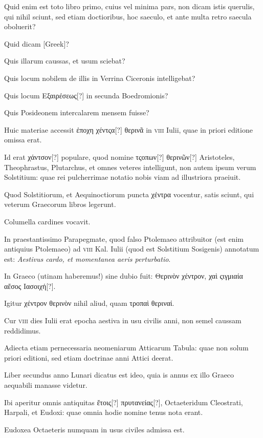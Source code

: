 \begin{parnumbers}
Quid enim est toto libro primo, cuius vel minima
pars, non dicam istis querulis, qui nihil sciunt, sed etiam doctioribus,
hoc saeculo, et ante multa retro saecula oboluerit?

Quid dicam \textgreek{[Greek]}?

Quis illarum caussas, et usum sciebat?

Quis
locum nobilem de illis in Verrina Ciceronis intelligebat?

Quis locum
\textgreek{Εξαιρέσεως[?]} in secunda Boedromionis?

Quis Posideonem intercalarem
mensem fuisse?

Huic materiae accessit \textgreek{ἐποχη χέντςα[?] θερινᾶ}
in \textsc{viii} Iulii, quae in priori editione omissa erat.

Id erat \textgreek{χάντσον[?]}
populare, quod nomine \textgreek{τςοπων[?] θερινῶν[?]}
 Aristoteles, Theophrastus,
Plutarchus, et omnes veteres intelligunt, non autem ipsum verum
Solstitium: quae rei pulcherrimae notatio nobis viam ad illustriora
praeiuit.

Quod Solstitiorum, et Aequinoctiorum puncta \textgreek{χέντρα} vocentur,
satis sciunt, qui veterum Graecorum libros legerunt.

Columella
cardines vocavit.

In praestantissimo Parapegmate, quod falso
Ptolemaeo attribuitor (est enim antiquius Ptolemaeo) ad \textsc{viii} Kal.
Iulii (quod est Solstitium Sosigenis) annotatum est: \textit{Aestivus cardo,
et momentanea aeris perturbatio}.

In Graeco (utinam haberemus!)
sine dubio fuit: \textgreek{Θερινὸν χέντρον, χαὶ ςιγμιαία αἔσος Ιασοιχή[?]}.

Igitur \textgreek{χέντρον
θερινὸν} nihil aliud, quam \textgreek{τροπαὶ θεριναί}.

Cur \textsc{viii} dies Iulii erat
epocha aestiva in usu civilis anni, non semel caussam reddidimus. 

Adiecta etiam pernecessaria neomeniarum Atticarum Tabula: quae
non solum priori editioni, sed etiam doctrinae anni Attici deerat.

Liber secundus anno Lunari dicatus est ideo, quia is annus ex illo
Graeco aequabili manasse videtur.

Ibi aperitur omnis antiquitas \textgreek{ἔτοις[?]
πρυτανείας[?]}, Octaeteridum Cleostrati, Harpali, et Eudoxi: quae omnia
hodie nomine tenus nota erant.

Eudoxea Octaeteris numquam
in usus civiles admissa est.


\end{parnumbers}
